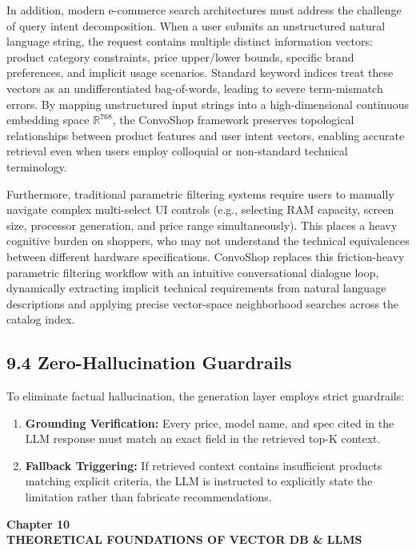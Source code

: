 \documentclass[12pt,a4paper]{article}
\begin{document}
In addition, modern e-commerce search architectures must address the challenge of query intent decomposition. When a user submits an unstructured natural language string, the request contains multiple distinct information vectors: product category constraints, price upper/lower bounds, specific brand preferences, and implicit usage scenarios. Standard keyword indices treat these vectors as an undifferentiated bag-of-words, leading to severe term-mismatch errors. By mapping unstructured input strings into a high-dimensional continuous embedding space $\mathbb{R}^{768}$, the ConvoShop framework preserves topological relationships between product features and user intent vectors, enabling accurate retrieval even when users employ colloquial or non-standard technical terminology.

Furthermore, traditional parametric filtering systems require users to manually navigate complex multi-select UI controls (e.g., selecting RAM capacity, screen size, processor generation, and price range simultaneously). This places a heavy cognitive burden on shoppers, who may not understand the technical equivalences between different hardware specifications. ConvoShop replaces this friction-heavy parametric filtering workflow with an intuitive conversational dialogue loop, dynamically extracting implicit technical requirements from natural language descriptions and applying precise vector-space neighborhood searches across the catalog index.

\subsection*{9.4 Zero-Hallucination Guardrails}
\label{sec:9.4}
To eliminate factual hallucination, the generation layer employs strict guardrails:
\begin{enumerate}
    \item \textbf{Grounding Verification:} Every price, model name, and spec cited in the LLM response must match an exact field in the retrieved top-K context.
    \item \textbf{Fallback Triggering:} If retrieved context contains insufficient products matching explicit criteria, the LLM is instructed to explicitly state the limitation rather than fabricate recommendations.
\end{enumerate}

\newpage

\label{chap:10}
\begin{center}
{\fontsize{14}{17}\bfseries Chapter 10\\[6pt]}
{\fontsize{16}{20}\bfseries THEORETICAL FOUNDATIONS OF VECTOR DB \& LLMS\\[10pt]}
\end{center}
\end{document}
